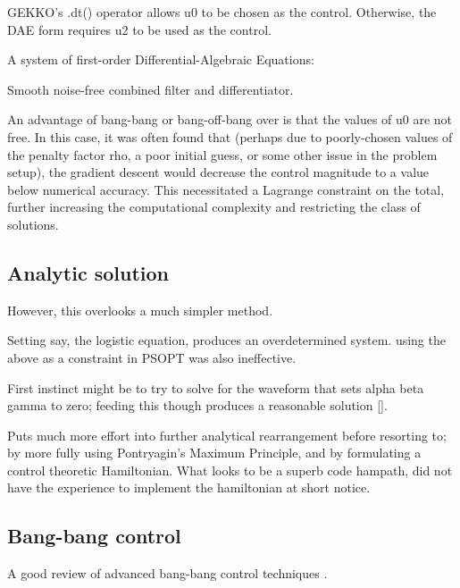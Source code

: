 \documentclass[fleqn,10pt]{paper}
\begin{document}



GEKKO's .dt() operator allows u0 to be chosen as the control. 
Otherwise, the DAE form requires u2 to be used as the control.

A system of first-order Differential-Algebraic Equations:

Smooth noise-free combined filter and differentiator.


An advantage of bang-bang or bang-off-bang over is that the values of u0 are not free. In this case, it was often found that (perhaps due to poorly-chosen values of the penalty factor rho, a poor initial guess, or some other issue in the problem setup), the gradient descent would decrease the control magnitude to a value below numerical accuracy. This necessitated a Lagrange constraint on the total, further increasing the computational complexity and restricting the class of solutions. 



\subsection*{Analytic solution}


However, this overlooks a much simpler method.

Setting say, the logistic equation, produces an overdetermined system. using the above as a constraint in PSOPT was also ineffective.

\begin{tcolorbox}
	First instinct might be to try to solve for the waveform that sets alpha beta gamma to zero; feeding this though produces a reasonable solution []. 
\end{tcolorbox}

Puts much more effort into further analytical rearrangement before resorting to; by more fully using Pontryagin's Maximum Principle, and by formulating a control theoretic Hamiltonian. What looks to be a superb code hampath, did not have the experience to implement the hamiltonian at short notice.


\subsection*{Bang-bang control}

A good review of advanced bang-bang control techniques \cite{Computations2004}. 
\end{document}
